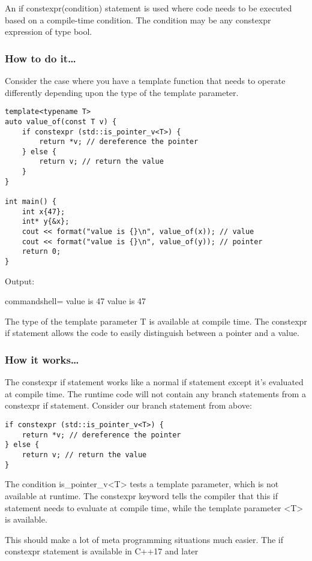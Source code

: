 
An if constexpr(condition) statement is used where code needs to be executed based on a compile-time condition. The condition may be any constexpr expression of type bool.

\subsubsection{How to do it…}

Consider the case where you have a template function that needs to operate differently depending upon the type of the template parameter.

\begin{lstlisting}[style=styleCXX]
template<typename T>
auto value_of(const T v) {
	if constexpr (std::is_pointer_v<T>) {
		return *v; // dereference the pointer
	} else {
		return v; // return the value
	}
}

int main() {
	int x{47};
	int* y{&x};
	cout << format("value is {}\n", value_of(x)); // value
	cout << format("value is {}\n", value_of(y)); // pointer
	return 0;
}
\end{lstlisting}

Output:

\begin{tcblisting}{commandshell={}}
value is 47
value is 47
\end{tcblisting}

The type of the template parameter T is available at compile time. The constexpr if statement allows the code to easily distinguish between a pointer and a value.

\subsubsection{How it works…}

The constexpr if statement works like a normal if statement except it's evaluated at compile time. The runtime code will not contain any branch statements from a constexpr if statement. Consider our branch statement from above:

\begin{lstlisting}[style=styleCXX]
if constexpr (std::is_pointer_v<T>) {
	return *v; // dereference the pointer
} else {
	return v; // return the value
}
\end{lstlisting}

The condition is\_pointer\_v<T> tests a template parameter, which is not available at runtime. The constexpr keyword tells the compiler that this if statement needs to evaluate at compile time, while the template parameter <T> is available.

This should make a lot of meta programming situations much easier. The if constexpr statement is available in C++17 and later













